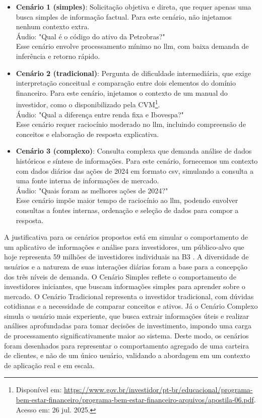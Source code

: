 \begin{itemize}
    \item \textbf{Cenário 1 (simples)}: Solicitação objetiva e direta, que requer apenas uma busca simples de informação factual. Para este cenário, não injetamos nenhum contexto extra. \\
    Áudio: "Qual é o código do ativo da Petrobras?" \\
    Esse cenário envolve processamento mínimo no \gls{llm}, com baixa demanda de inferência e retorno rápido.
    \item \textbf{Cenário 2 (tradicional)}: Pergunta de dificuldade intermediária, que exige interpretação conceitual e comparação entre dois elementos do domínio financeiro. Para este cenário, injetamos o contexto de um manual do investidor, como o disponibilizado pela CVM\footnote{Disponível em: \url{https://www.gov.br/investidor/pt-br/educacional/programa-bem-estar-financeiro/programa-bem-estar-financeiro-arquivos/apostila-06.pdf}. Acesso em: 26 jul. 2025.}. \\
    Áudio: "Qual a diferença entre renda fixa e Ibovespa?" \\
    Esse cenário requer raciocínio moderado no \gls{llm}, incluindo compreensão de conceitos e elaboração de resposta explicativa.
    \item \textbf{Cenário 3 (complexo)}: Consulta complexa que demanda análise de dados históricos e síntese de informações. Para este cenário, fornecemos um contexto com dados diários das ações de 2024 em formato \gls{csv}, simulando a consulta a uma fonte interna de informações de mercado. \\
    Áudio: "Quais foram as melhores ações de 2024?" \\
    Esse cenário impõe maior tempo de raciocínio ao \gls{llm}, podendo envolver consultas a fontes internas, ordenação e seleção de dados para compor a resposta.
\end{itemize}

A justificativa para os cenários propostos está em simular o comportamento de um aplicativo de informações e análise para investidores, um público-alvo que hoje representa 59 milhões de investidores individuais na B3 \cite{anbima_raio_nodate}. A diversidade de usuários e a natureza de suas interações diárias foram a base para a concepção dos três níveis de demanda. O Cenário Simples reflete o comportamento de investidores iniciantes, que buscam informações simples para aprender sobre o mercado. O Cenário Tradicional representa o investidor tradicional, com dúvidas cotidianas e a necessidade de comparar conceitos e ativos. Já o Cenário Complexo simula o usuário mais experiente, que busca extrair informações úteis e realizar análises aprofundadas para tomar decisões de investimento, impondo uma carga de processamento significativamente maior ao sistema. Deste modo, os cenários foram desenhados para representar o comportamento agregado de uma carteira de clientes, e não de um único usuário, validando a abordagem em um contexto de aplicação real e em escala.

